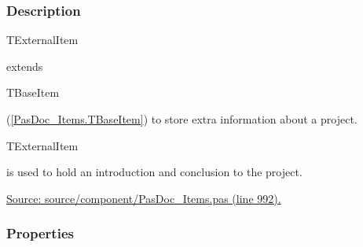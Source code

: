\documentclass{report}
\begin{document}
\subsubsection*{\large{\textbf{Description}}\normalsize\hspace{1ex}\hfill}
\begin{ttfamily}TExternalItem\end{ttfamily} extends \begin{ttfamily}TBaseItem\end{ttfamily}(\ref{PasDoc_Items.TBaseItem}) to store extra information about a project. \begin{ttfamily}TExternalItem\end{ttfamily} is used to hold an introduction and conclusion to the project.\par
\href{https://github.com/pasdoc/pasdoc/blob/master/source/component/PasDoc_Items.pas#L992}{Source: source/component/PasDoc{\_}Items.pas (line 992).}\subsubsection*{\large{\textbf{Properties}}\normalsize\hspace{1ex}\hfill}
\end{document}
